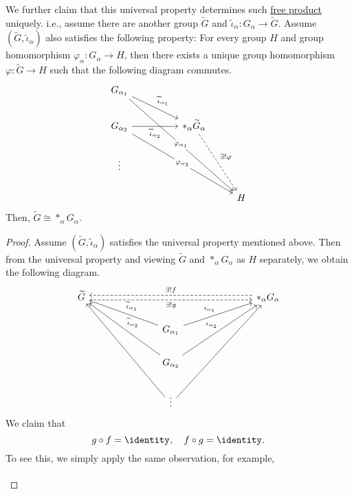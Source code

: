 \begin{remark}
	We further claim that this universal property determines such \hyperref[def:free-product]{free product} uniquely. i.e., assume there are another group \(\widetilde{G} \) and
	\(\widetilde{\iota} _\alpha \colon G_\alpha \to \widetilde{G}\). Assume \((\widetilde{G} , \widetilde{\iota} _\alpha  )\) also satisfies the following property: For every
	group \(H\) and group homomorphism \(\varphi _\alpha \colon G_\alpha \to H\), then there exists a unique group homomorphism \(\varphi \colon \widetilde{G} \to H\) such that
	the following diagram commutes.
	\[\begin{tikzcd}
			{G_{\alpha_1}} \\
			{G_{\alpha_2}} && {\ast_\alpha \widetilde{G} _\alpha} \\
			\vdots \\
			&&& H
			\arrow["{\widetilde{\iota}_{\alpha_1}}", from=1-1, to=2-3]
			\arrow["{\widetilde{\iota}_{\alpha_2}}"', from=2-1, to=2-3]
			\arrow["{\exists ! \varphi}", dashed, from=2-3, to=4-4]
			\arrow["{\varphi_{\alpha_1}}"{description}, from=1-1, to=4-4]
			\arrow["{\varphi_{\alpha_2}}"{description}, from=2-1, to=4-4]
		\end{tikzcd}\]
	Then, \(\widetilde{G} \cong \ast_\alpha G_\alpha \).
	\begin{proof}
		Assume \((\widetilde{G} , \widetilde{\iota} _\alpha  )\) satisfies the universal property mentioned above. Then from the universal property and viewing \(\widetilde{G} \) and
		\(\ast_\alpha G_\alpha \) as \(H\) separately, we obtain the following diagram.
		\[\begin{tikzcd}
				{\widetilde{G}} &&&&&& {\ast_\alpha G_\alpha} \\
				&&& {G_{\alpha_1}} \\
				&&& {G_{\alpha_2}} \\
				&&& \vdots
				\arrow["{\iota_{\alpha_1}}", from=2-4, to=1-7]
				\arrow["{\iota_{\alpha_2}}", from=3-4, to=1-7]
				\arrow["{\exists ! f}"', shift right=1, dashed, from=1-7, to=1-1]
				\arrow["{\widetilde{\iota}_{\alpha_1}}"', from=2-4, to=1-1]
				\arrow["{\widetilde{\iota}_{\alpha_2}}"', from=3-4, to=1-1]
				\arrow[from=4-4, to=1-1]
				\arrow[from=4-4, to=1-7]
				\arrow["{\exists! g}"', shift right=1, dashed, from=1-1, to=1-7]
			\end{tikzcd}\]
		We claim that
		\[
			g\circ f = \identity_{},\quad f\circ g = \identity_{}.
		\]
		To see this, we simply apply the same observation, for example,
		\[\begin{tikzcd}

\end{tikzcd}\]
\end{proof}
\end{remark}
